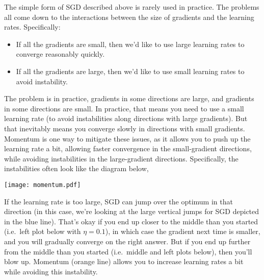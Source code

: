 \documentclass{article}
\newcommand{\0}{\mathbf{0}}
\begin{document}
The simple form of SGD described above is rarely used in practice.
The problems all come down to the interactions between the size of gradients and the learning rates.
Specifically:
\begin{itemize}
  \item If all the gradients are small, then we'd like to use large learning rates to converge reasonably quickly.
  \item If all the gradients are large, then we'd like to use small learning rates to avoid instability.
\end{itemize}
The problem is in practice, gradients in some directions are large, and gradients in some directions are small.
In practice, that means you need to use a small learning rate (to avoid instabilities along directions with large gradients).
But that inevitably means you converge slowly in directions with small gradients.
Momentum is one way to mitigate these issues, as it allows you to push up the learning rate a bit, allowing faster convergence in the small-gradient directions, while avoiding instabilities in the large-gradient directions.
Specifically, the instabilities often look like the diagram below,
\begin{center}
  \texttt{[image: momentum.pdf]}
\end{center}
If the learning rate is too large, SGD can jump over the optimum in that direction (in this case, we're looking at the large vertical jumps for SGD depicted in the blue line).
That's okay if you end up closer to the middle than you started (i.e.\ left plot below with $\eta=0.1$), in which case the gradient next time is smaller, and you will gradually converge on the right answer.
But if you end up further from the middle than you started (i.e.\ middle and left plots below), then you'll blow up.
Momentum (orange line) allows you to increase learning rates a bit while avoiding this instability.
\end{document}
